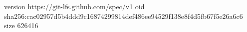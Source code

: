 version https://git-lfs.github.com/spec/v1
oid sha256:cac02957d5b4ddd9c16874299814def486ee94529f138e8f4d5fb67f5e26a6c6
size 626416
